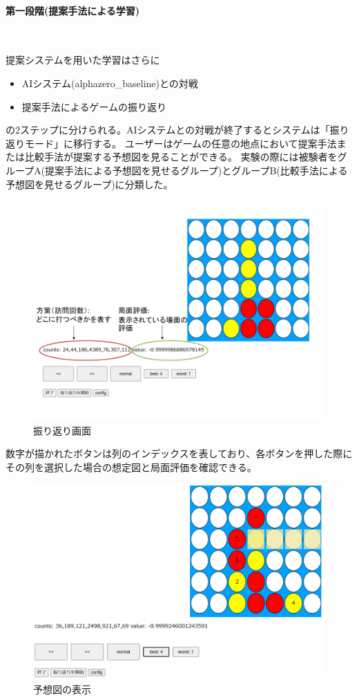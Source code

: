\paragraph{第一段階(提案手法による学習)}~
\par 提案システムを用いた学習はさらに
\begin{itemize}
	\item AIシステム(alphazero\_baseline)との対戦
	\item 提案手法によるゲームの振り返り
\end{itemize}
の2ステップに分けられる。AIシステムとの対戦が終了するとシステムは「振り返りモード」に移行する。
ユーザーはゲームの任意の地点において提案手法または比較手法が提案する予想図を見ることができる。
実験の際には被験者をグループA(提案手法による予想図を見せるグループ)とグループB(比較手法による予想図を見せるグループ)に分類した。
\begin{figure}[t]
	\centering
	\includegraphics[width=\linewidth]{./figure/lookBack.png}
	\caption{振り返り画面}
	\label{fig:lookBack}
\end{figure}
数字が描かれたボタンは列のインデックスを表しており、各ボタンを押した際にその列を選択した場合の想定図と局面評価を確認できる。
\begin{figure}[t]
	\centering
	\includegraphics[width=\linewidth]{./figure/trajSystem.png}
	\caption{予想図の表示}
	\label{fig:trajSystem}
\end{figure}
